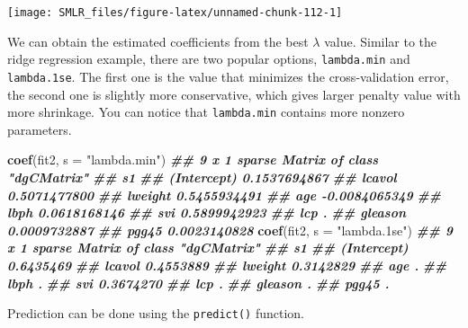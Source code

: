 \documentclass[
]{book}
\newenvironment{Shaded}{\begin{snugshade}}{\end{snugshade}}
\newcommand{\AttributeTok}[1]{\textcolor[rgb]{0.13,0.29,0.53}{#1}}
\newcommand{\CommentTok}[1]{\textcolor[rgb]{0.56,0.35,0.01}{\textit{#1}}}
\newcommand{\DecValTok}[1]{\textcolor[rgb]{0.00,0.00,0.81}{#1}}
\newcommand{\DocumentationTok}[1]{\textcolor[rgb]{0.56,0.35,0.01}{\textbf{\textit{#1}}}}
\newcommand{\FunctionTok}[1]{\textcolor[rgb]{0.13,0.29,0.53}{\textbf{#1}}}
\newcommand{\NormalTok}[1]{#1}
\newcommand{\OtherTok}[1]{\textcolor[rgb]{0.56,0.35,0.01}{#1}}
\newcommand{\SpecialCharTok}[1]{\textcolor[rgb]{0.81,0.36,0.00}{\textbf{#1}}}
\newcommand{\StringTok}[1]{\textcolor[rgb]{0.31,0.60,0.02}{#1}}
\theoremstyle{definition}
\theoremstyle{definition}
\theoremstyle{definition}
\theoremstyle{definition}
\theoremstyle{remark}
\begin{document}
\begin{center}\texttt{[image: SMLR\_files/figure-latex/unnamed-chunk-112-1]} \end{center}

We can obtain the estimated coefficients from the best \(\lambda\) value. Similar to the ridge regression example, there are two popular options, \texttt{lambda.min} and \texttt{lambda.1se}. The first one is the value that minimizes the cross-validation error, the second one is slightly more conservative, which gives larger penalty value with more shrinkage. You can notice that \texttt{lambda.min} contains more nonzero parameters.

\begin{Shaded}
\begin{Highlighting}[]
    \FunctionTok{coef}\NormalTok{(fit2, }\AttributeTok{s =} \StringTok{"lambda.min"}\NormalTok{)}
\DocumentationTok{\#\# 9 x 1 sparse Matrix of class "dgCMatrix"}
\DocumentationTok{\#\#                        s1}
\DocumentationTok{\#\# (Intercept)  0.1537694867}
\DocumentationTok{\#\# lcavol       0.5071477800}
\DocumentationTok{\#\# lweight      0.5455934491}
\DocumentationTok{\#\# age         {-}0.0084065349}
\DocumentationTok{\#\# lbph         0.0618168146}
\DocumentationTok{\#\# svi          0.5899942923}
\DocumentationTok{\#\# lcp          .           }
\DocumentationTok{\#\# gleason      0.0009732887}
\DocumentationTok{\#\# pgg45        0.0023140828}
    \FunctionTok{coef}\NormalTok{(fit2, }\AttributeTok{s =} \StringTok{"lambda.1se"}\NormalTok{)}
\DocumentationTok{\#\# 9 x 1 sparse Matrix of class "dgCMatrix"}
\DocumentationTok{\#\#                    s1}
\DocumentationTok{\#\# (Intercept) 0.6435469}
\DocumentationTok{\#\# lcavol      0.4553889}
\DocumentationTok{\#\# lweight     0.3142829}
\DocumentationTok{\#\# age         .        }
\DocumentationTok{\#\# lbph        .        }
\DocumentationTok{\#\# svi         0.3674270}
\DocumentationTok{\#\# lcp         .        }
\DocumentationTok{\#\# gleason     .        }
\DocumentationTok{\#\# pgg45       .}
\end{Highlighting}
\end{Shaded}

Prediction can be done using the \texttt{predict()} function.

\begin{Shaded}
\end{Shaded}
\end{document}
